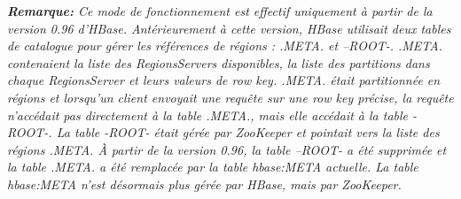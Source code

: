 \textit{\textbf{Remarque: }Ce mode de fonctionnement est effectif uniquement à partir de la version 0.96 d'HBase. Antérieurement à cette version, HBase utilisait deux tables de catalogue pour gérer les références de régions : .META. et –ROOT-. .META. contenaient la liste des RegionsServers disponibles, la liste des partitions dans chaque RegionsServer et leurs valeurs de row key. .META. était partitionnée en régions et lorsqu'un client envoyait une requête sur une row key précise, la requête n'accédait pas directement à la table .META., mais elle accédait à la table -ROOT-. La table -ROOT- était gérée par ZooKeeper et pointait vers la liste des régions .META. À partir de la version 0.96, la table –ROOT- a été supprimée et la table .META. a été remplacée par la table hbase:META actuelle. La table  hbase:META n'est désormais plus gérée par HBase, mais par ZooKeeper.}














